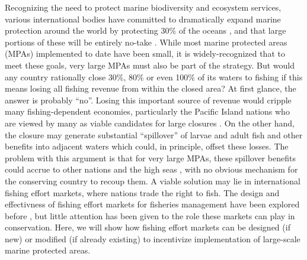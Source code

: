 \documentclass[12pt]{article}
\begin{document}
Recognizing the need to protect marine biodiversity and ecosystem services, various international bodies have committed to dramatically expand marine protection around the world by protecting 30\% of the oceans \cite{oleary_2016,dinerstein_2019}, and that large portions of these will be entirely no-take \cite{sala_2017,sala_2018}. While most marine protected areas (MPAs) implemented to date have been small, it is widely-recognized that to meet these goals, very large MPAs must also be part of the strategy. But would any country rationally close 30\%, 80\% or even 100\% of its waters to fishing if this means losing all fishing revenue from within the closed area? At first glance, the answer is probably ``no''. Losing this important source of revenue would cripple many fishing-dependent economies, particularly the Pacific Island nations who are viewed by many as viable candidates for large closures \cite{mcleod_2019}. On the other hand, the closure may generate substantial ``spillover'' of larvae and adult fish \cite{ramesh_2019,hernndez_2019} and other benefits into adjacent waters which could, in principle, offset these losses. The problem with this argument is that for very large MPAs, these spillover benefits could accrue to other nations and the high seas \cite{agardy_2018}, with no obvious mechanism for the conserving country to recoup them. A viable solution may lie in international fishing effort markets, where nations trade the right to fish. The design and effectivness of fishing effort markets for fisheries management have been explored before \cite{havice_2010,havice_2013}, but little attention has been given to the role these markets can play in conservation. Here, we will show how fishing effort markets can be designed (if new) or modified (if already existing) to incentivize implementation of large-scale marine protected areas.
\end{document}
